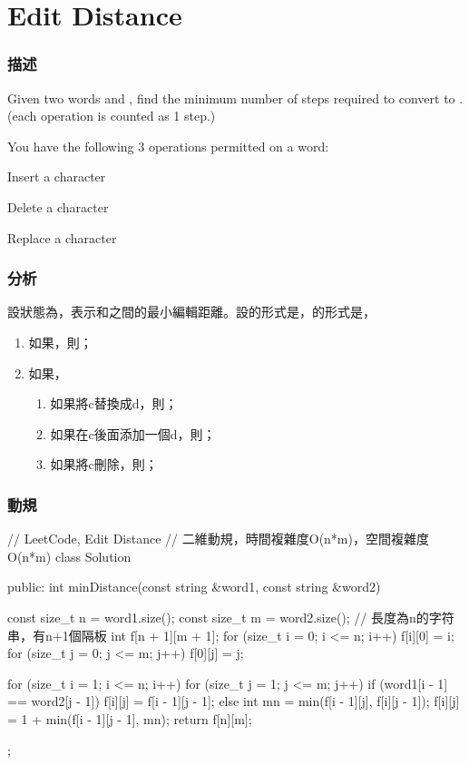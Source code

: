 \section{Edit Distance} %
\label{sec:edit-distance}


\subsubsection{描述}
Given two words  and , find the minimum number of steps required to convert  to . (each operation is counted as 1 step.)

You have the following 3 operations permitted on a word:
\begindot
\item Insert a character
\item Delete a character
\item Replace a character
\myenddot


\subsubsection{分析}
設狀態為，表示和之間的最小編輯距離。設的形式是，的形式是，
\begin{enumerate}
\item 如果，則；
\item 如果，
    \begin{enumerate}
        \item 如果將c替換成d，則；
        \item 如果在c後面添加一個d，則；
        \item 如果將c刪除，則；
    \end{enumerate}
\end{enumerate}


\subsubsection{動規}
\begin{Code}
// LeetCode, Edit Distance
// 二維動規，時間複雜度O(n*m)，空間複雜度O(n*m)
class Solution {
public:
    int minDistance(const string &word1, const string &word2) {
        const size_t n = word1.size();
        const size_t m = word2.size();
        // 長度為n的字符串，有n+1個隔板
        int f[n + 1][m + 1];
        for (size_t i = 0; i <= n; i++)
            f[i][0] = i;
        for (size_t j = 0; j <= m; j++)
            f[0][j] = j;

        for (size_t i = 1; i <= n; i++) {
            for (size_t j = 1; j <= m; j++) {
                if (word1[i - 1] == word2[j - 1])
                    f[i][j] = f[i - 1][j - 1];
                else {
                    int mn = min(f[i - 1][j], f[i][j - 1]);
                    f[i][j] = 1 + min(f[i - 1][j - 1], mn);
                }
            }
        }
        return f[n][m];
    }
};
\end{Code}


